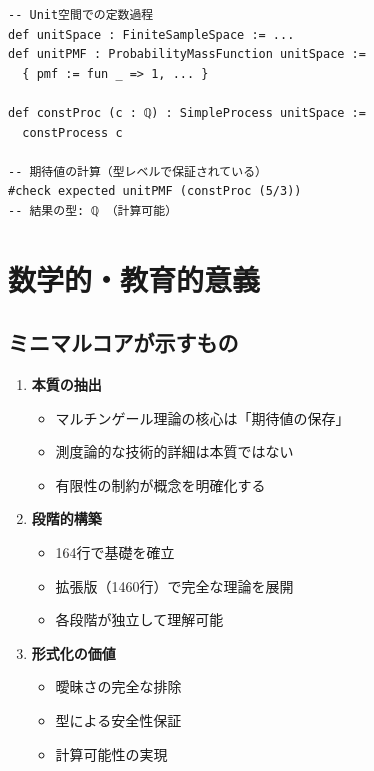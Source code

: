 \documentclass[a4paper,12pt]{ltjsarticle}
\theoremstyle{definition}
\begin{document}
\begin{codebox}
\begin{verbatim}
-- Unit空間での定数過程
def unitSpace : FiniteSampleSpace := ...
def unitPMF : ProbabilityMassFunction unitSpace :=
  { pmf := fun _ => 1, ... }

def constProc (c : ℚ) : SimpleProcess unitSpace :=
  constProcess c

-- 期待値の計算（型レベルで保証されている）
#check expected unitPMF (constProc (5/3))
-- 結果の型: ℚ （計算可能）
\end{verbatim}
\end{codebox}

\section{数学的・教育的意義}

\subsection{ミニマルコアが示すもの}

\begin{enumerate}
\item \textbf{本質の抽出}
  \begin{itemize}
    \item マルチンゲール理論の核心は「期待値の保存」
    \item 測度論的な技術的詳細は本質ではない
    \item 有限性の制約が概念を明確化する
  \end{itemize}

\item \textbf{段階的構築}
  \begin{itemize}
    \item 164行で基礎を確立
    \item 拡張版（1460行）で完全な理論を展開
    \item 各段階が独立して理解可能
  \end{itemize}

\item \textbf{形式化の価値}
  \begin{itemize}
    \item 曖昧さの完全な排除
    \item 型による安全性保証
    \item 計算可能性の実現
  \end{itemize}
\end{enumerate}
\end{document}
